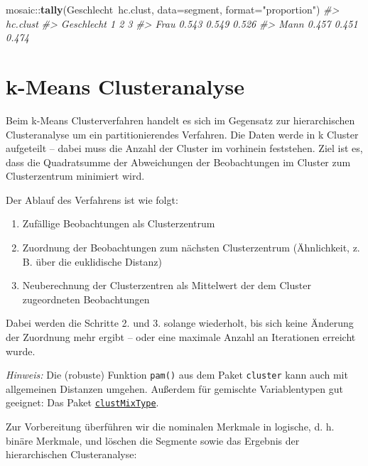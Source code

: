 \documentclass[12pt,]{book}
\newenvironment{Shaded}{\begin{snugshade}}{\end{snugshade}}
\newcommand{\KeywordTok}[1]{\textcolor[rgb]{0.13,0.29,0.53}{\textbf{{#1}}}}
\newcommand{\DataTypeTok}[1]{\textcolor[rgb]{0.13,0.29,0.53}{{#1}}}
\newcommand{\StringTok}[1]{\textcolor[rgb]{0.31,0.60,0.02}{{#1}}}
\newcommand{\CommentTok}[1]{\textcolor[rgb]{0.56,0.35,0.01}{\textit{{#1}}}}
\newcommand{\NormalTok}[1]{{#1}}
\providecommand{\tightlist}{%
  \setlength{\itemsep}{0pt}\setlength{\parskip}{0pt}}
\begin{document}
\begin{Shaded}
\begin{Highlighting}[]
\NormalTok{mosaic::}\KeywordTok{tally}\NormalTok{(Geschlecht~hc.clust, }\DataTypeTok{data=}\NormalTok{segment, }\DataTypeTok{format=}\StringTok{"proportion"}\NormalTok{)}
\CommentTok{#>           hc.clust}
\CommentTok{#> Geschlecht     1     2     3}
\CommentTok{#>       Frau 0.543 0.549 0.526}
\CommentTok{#>       Mann 0.457 0.451 0.474}
\end{Highlighting}
\end{Shaded}

\section{k-Means Clusteranalyse}\label{k-means-clusteranalyse}

Beim k-Means Clusterverfahren handelt es sich im Gegensatz zur
hierarchischen Clusteranalyse um ein partitionierendes Verfahren. Die
Daten werde in k Cluster aufgeteilt -- dabei muss die Anzahl der Cluster
im vorhinein feststehen. Ziel ist es, dass die Quadratsumme der
Abweichungen der Beobachtungen im Cluster zum Clusterzentrum minimiert
wird.

Der Ablauf des Verfahrens ist wie folgt:

\begin{enumerate}
\def\labelenumi{\arabic{enumi}.}
\tightlist
\item
  Zufällige Beobachtungen als Clusterzentrum
\item
  Zuordnung der Beobachtungen zum nächsten Clusterzentrum (Ähnlichkeit,
  z. B. über die euklidische Distanz)
\item
  Neuberechnung der Clusterzentren als Mittelwert der dem Cluster
  zugeordneten Beobachtungen
\end{enumerate}

Dabei werden die Schritte 2. und 3. solange wiederholt, bis sich keine
Änderung der Zuordnung mehr ergibt -- oder eine maximale Anzahl an
Iterationen erreicht wurde.

\emph{Hinweis:} Die (robuste) Funktion \texttt{pam()} aus dem Paket
\texttt{cluster} kann auch mit allgemeinen Distanzen umgehen. Außerdem
für gemischte Variablentypen gut geeignet: Das Paket
\href{https://cran.r-project.org/web/packages/clustMixType/index.html}{\texttt{clustMixType}}.

Zur Vorbereitung überführen wir die nominalen Merkmale in logische, d.
h. binäre Merkmale, und löschen die Segmente sowie das Ergebnis der
hierarchischen Clusteranalyse:
\end{document}
